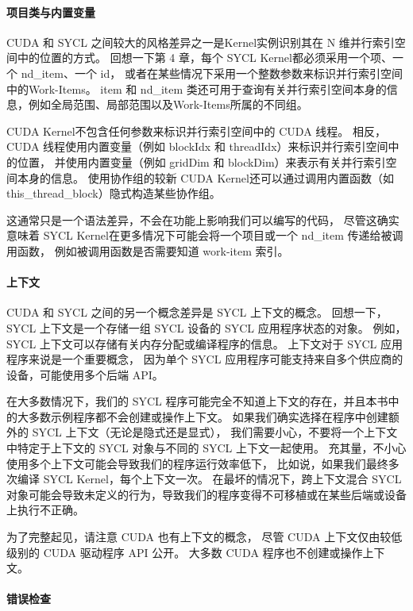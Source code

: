 \paragraph{项目类与内置变量}

CUDA 和 SYCL 之间较大的风格差异之一是Kernel实例识别其在 N 维并行索引空间中的位置的方式。 
回想一下第 4 章，每个 SYCL Kernel都必须采用一个项、一个 nd\_item、一个 id，
或者在某些情况下采用一个整数参数来标识并行索引空间中的Work-Items。 
item 和 nd\_item 类还可用于查询有关并行索引空间本身的信息，例如全局范围、局部范围以及Work-Items所属的不同组。

CUDA Kernel不包含任何参数来标识并行索引空间中的 CUDA 线程。 
相反，CUDA 线程使用内置变量（例如 blockIdx 和 threadIdx）来标识并行索引空间中的位置，
并使用内置变量（例如 gridDim 和 blockDim）来表示有关并行索引空间本身的信息。 
使用协作组的较新 CUDA Kernel还可以通过调用内置函数（如 this\_thread\_block）隐式构造某些协作组。

这通常只是一个语法差异，不会在功能上影响我们可以编写的代码，
尽管这确实意味着 SYCL Kernel在更多情况下可能会将一个项目或一个 nd\_item 传递给被调用函数，
例如被调用函数是否需要知道 work-item 索引。

\paragraph{上下文}

CUDA 和 SYCL 之间的另一个概念差异是 SYCL 上下文的概念。 
回想一下，SYCL 上下文是一个存储一组 SYCL 设备的 SYCL 应用程序状态的对象。 
例如，SYCL 上下文可以存储有关内存分配或编译程序的信息。 上下文对于 SYCL 应用程序来说是一个重要概念，
因为单个 SYCL 应用程序可能支持来自多个供应商的设备，可能使用多个后端 API。

在大多数情况下，我们的 SYCL 程序可能完全不知道上下文的存在，并且本书中的大多数示例程序都不会创建或操作上下文。 
如果我们确实选择在程序中创建额外的 SYCL 上下文（无论是隐式还是显式），
我们需要小心，不要将一个上下文中特定于上下文的 SYCL 对象与不同的 SYCL 上下文一起使用。 
充其量，不小心使用多个上下文可能会导致我们的程序运行效率低下，
比如说，如果我们最终多次编译 SYCL Kernel，每个上下文一次。 
在最坏的情况下，跨上下文混合 SYCL 对象可能会导致未定义的行为，导致我们的程序变得不可移植或在某些后端或设备上执行不正确。

为了完整起见，请注意 CUDA 也有上下文的概念，
尽管 CUDA 上下文仅由较低级别的 CUDA 驱动程序 API 公开。 大多数 CUDA 程序也不创建或操作上下文。

\paragraph{错误检查}


